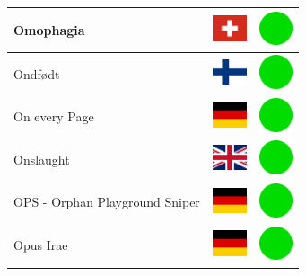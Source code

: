 \documentclass[12pt, a4paper, twoside]{report}
\begin{document}
\begin{center}
\begin{longtable}{|p{5cm}|p{2cm}|p{2cm}|}
 Omophagia                                                  & \includegraphics[width=1cm]{../img/flags/ch} &   \includegraphics[width=1cm]{../likes/y} \\ \hline
 Ondfødt                                                    & \includegraphics[width=1cm]{../img/flags/fi} &   \includegraphics[width=1cm]{../likes/y} \\ \hline
 On every Page                                              & \includegraphics[width=1cm]{../img/flags/de} &   \includegraphics[width=1cm]{../likes/y} \\ \hline
 Onslaught                                                  & \includegraphics[width=1cm]{../img/flags/gb} &   \includegraphics[width=1cm]{../likes/y} \\ \hline
 OPS - Orphan Playground Sniper                             & \includegraphics[width=1cm]{../img/flags/de} &   \includegraphics[width=1cm]{../likes/y} \\ \hline
 Opus Irae                                                  & \includegraphics[width=1cm]{../img/flags/de} &   \includegraphics[width=1cm]{../likes/y} \\ \hline

\end{longtable}
\end{center}
\end{document}
